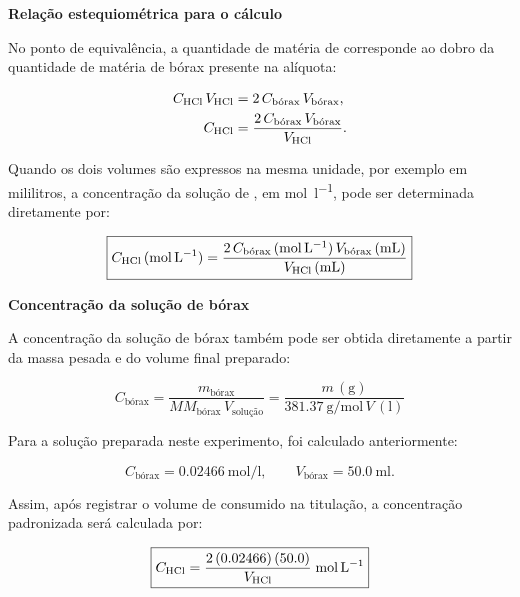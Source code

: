 \documentclass[a4paper,12pt]{article}
\newcommand{\subtitulo}[1]{%
  \par\medskip
  {\color{quadroazul}\bfseries\large #1}\par\smallskip
}
\begin{document}
\subtitulo{Relação estequiométrica para o cálculo}

No ponto de equivalência, a quantidade de matéria de  corresponde ao dobro da quantidade de matéria de bórax presente na alíquota:

\begin{align*}
  C_{\ce{HCl}}\,V_{\ce{HCl}}
    &= 2\,C_{\text{bórax}}\,V_{\text{bórax}}, \\
  C_{\ce{HCl}}
    &= \frac{2\,C_{\text{bórax}}\,V_{\text{bórax}}}
             {V_{\ce{HCl}}}.
\end{align*}

Quando os dois volumes são expressos na mesma unidade, por exemplo em mililitros, a concentração da solução de , em \unit{\mole\per\litre}, pode ser determinada diretamente por:

\begin{equation*}
  \boxed{
  C_{\ce{HCl}}\,(\unit{\mole\per\litre})
    = \frac{2\,C_{\text{bórax}}\,(\unit{\mole\per\litre})
             \,V_{\text{bórax}}\,(\unit{\milli\litre})}
            {V_{\ce{HCl}}\,(\unit{\milli\litre})}
  }
\end{equation*}

\subtitulo{Concentração da solução de bórax}

A concentração da solução de bórax também pode ser obtida diretamente a partir da massa pesada e do volume final preparado:

\begin{equation*}
  \boxed{
  C_{\text{bórax}}
    = \frac{m_{\text{bórax}}}
           {MM_{\text{bórax}}\,V_{\text{solução}}}
    = \frac{m\,(\unit{\gram})}
           {\qty{381.37}{\gram\per\mole}\,V\,(\unit{\litre})}
  }
\end{equation*}

Para a solução preparada neste experimento, foi calculado anteriormente:

\begin{equation*}
  C_{\text{bórax}}=\qty{0.02466}{\mole\per\litre},
  \qquad
  V_{\text{bórax}}=\qty{50.0}{\milli\litre}.
\end{equation*}

Assim, após registrar o volume de  consumido na titulação, a concentração padronizada será calculada por:

\begin{equation*}
  \boxed{
  C_{\ce{HCl}}
    = \frac{2\,(0.02466)\,(50.0)}{V_{\ce{HCl}}}
    \;\unit{\mole\per\litre}
  }
\end{equation*}
\end{document}
